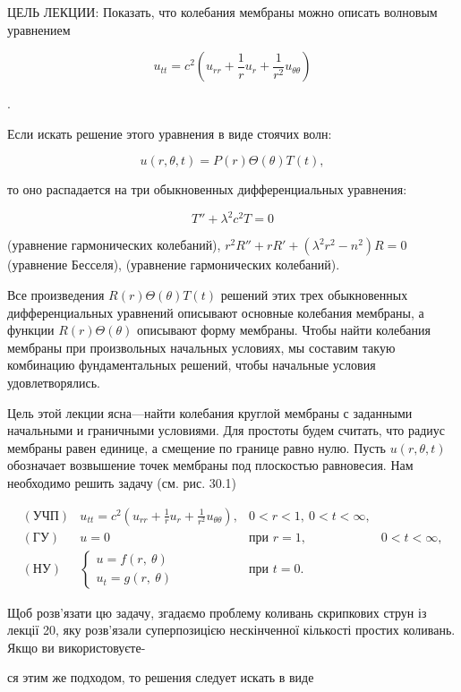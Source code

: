 \documentclass[
  ukrainian,
]{article}
\begin{document}
ЦЕЛЬ ЛЕКЦИИ: Показать, что колебания мембраны можно описать волновым
уравнением

\[
u_{tt} = c^2 \left( u_{rr} + \frac{1}{r} u_r + \frac{1}{r^2} u_{\theta\theta} \right)
\]

.

Если искать решение этого уравнения в виде стоячих волн:

\[
u(r, \theta, t) = P(r) \Theta(\theta) T(t),
\]

то оно распадается на три обыкновенных дифференциальных уравнения:

\[
T'' + \lambda^2 c^2 T = 0
\]

(уравнение гармонических колебаний),
\(r^2 R'' + rR' + (\lambda^2 r^2 - n^2) R = 0\) (уравнение Бесселя),
(уравнение гармонических колебаний).

Все произведения \(R(r) \Theta(\theta) T(t)\) решений этих трех
обыкновенных дифференциальных уравнений описывают основные колебания
мембраны, а функции \(R(r) \Theta(\theta)\) описывают форму мембраны.
Чтобы найти колебания мембраны при произвольных начальных условиях, мы
составим такую комбинацию фундаментальных решений, чтобы начальные
условия удовлетворялись.

Цель этой лекции ясна---найти колебания круглой мембраны с заданными
начальными и граничными условиями. Для простоты будем считать, что
радиус мембраны равен единице, а смещение по границе равно нулю. Пусть
\(u\left(r,\theta,t\right)\) обозначает возвышение точек мембраны под
плоскостью равновесия. Нам необходимо решить задачу (см. рис. 30.1)

\[
\begin{array}{llll} (\text{УЧП}) & u_{tt} = c^2 \left( u_{rr} + \frac{1}{r} u_r + \frac{1}{r^2} u_{\theta\theta} \right), & 0 < r < 1, \ 0 < t < \infty, \\ (\text{ГУ}) & u = 0 & \text{при } r = 1, & 0 < t < \infty, \\ (\text{НУ}) & \begin{cases} u = f(r, \ \theta) \\ u_t = g(r, \ \theta) \end{cases} & \text{при } t = 0. \end{array}
\]

Щоб розв'язати цю задачу, згадаємо проблему коливань скрипкових струн із
лекції 20, яку розв'язали суперпозицією нескінченної кількості простих
коливань. Якщо ви використовуєте-

ся этим же подходом, то решения следует искать в виде
\end{document}
